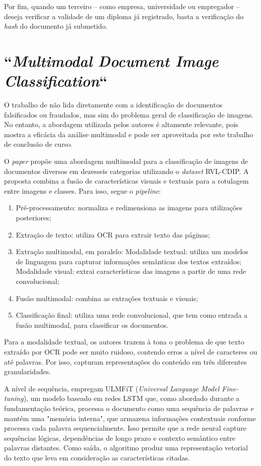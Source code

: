 Por fim, quando um terceiro -- como empresa, universidade ou empregador -- deseja verificar a validade de um diploma já registrado, basta a verificação do \textit{hash} do documento já submetido.

\section{``\protect\textit{Multimodal Document Image Classification}``}

O trabalho de \citeauthor*{multimodal} \cite*{multimodal} não lida diretamente com a identificação de documentos falsificados ou fraudados, mas sim do problema geral de classificação de imagens. No entanto, a abordagem utilizada pelos autores é altamente relevante, pois mostra a eficácia da análise multimodal e pode ser aproveitada por este trabalho de conclusão de curso.

O \textit{paper} propõe uma abordagem multimodal para a classificação de imagens de documentos diversos em dezesseis categorias utilizando o \textit{dataset} RVL-CDIP. A proposta combina a fusão de características visuais e textuais para a rotulagem entre imagens e classes. Para isso, segue o \textit{pipeline}:

\begin{enumerate}
    \item Pré-processamento: normaliza e redimensiona as imagens para utilizações posteriores;
    \item Extração de texto: utiliza OCR para extrair texto das páginas;
    \item Extração multimodal, em paralelo:
    \subitem Modalidade textual: utiliza um modelos de linguagem para capturar informações semânticas dos textos extraídos;
    \subitem Modalidade visual: extrai características das imagens a partir de uma rede convolucional;
    \item Fusão multimodal: combina as extrações textuais e visuais;
    \item Classificação final: utiliza uma rede convolucional, que tem como entrada a fusão multimodal, para classificar os documentos.
\end{enumerate}

Para a modalidade textual, os autores trazem à tona o problema de que texto extraído por OCR pode ser muito ruidoso, contendo erros a nível de caracteres ou até palavras. Por isso, capturam representações do conteúdo em três diferentes granularidades. 

A nível de sequência, empregam ULMFiT (\textit{Universal Language Model Fine-tuning}), um modelo baseado em redes LSTM que, como abordado durante a fundamentação teórica, processa o documento como uma sequência de palavras e mantém uma "memória interna", que armazena informações contextuais conforme processa cada palavra sequencialmente. Isso permite que a rede neural capture sequências lógicas, dependências de longo prazo e contexto semântico entre palavras distantes. Como saída, o algoritmo produz uma representação vetorial do texto que leva em consideração as características citadas.

